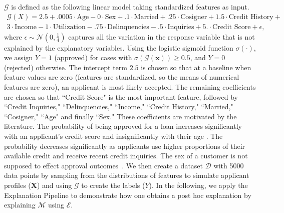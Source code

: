 \documentclass[12pt]{article}  %
\begin{document}
    $\mathcal{G}$ is defined as the following linear model taking standardized features as input. 
    \begin{equation}
    \label{eqn:gt}
    \begin{split}
    \mathcal{G}(X) =2.5 +.0005\cdot\text{Age} -0\cdot\text{Sex} +.1 \cdot \text{Married} + .25\cdot \text{Cosigner} + 1.5 \cdot \text{Credit History} + \\   3 \cdot \text{Income} - 1\cdot\text{Utilization} -.75 \cdot \text{Delinquencies} - .5\cdot\text{Inquiries} + 5.\cdot\text{Credit Score} + \epsilon,
    \end{split}
    \end{equation}
    \noindent where $\epsilon \sim \mathcal{N}(0,\frac{1}{4})$ captures all the variation in the response variable that is not explained by the explanatory variables.
    Using the logistic sigmoid function $\sigma(\cdot)$, we assign $Y = 1$ (approved) for cases with $\sigma(\mathcal{G}(\mathbf{x}))\geq 0.5$, and $Y = 0$ (rejected) otherwise. The intercept term $2.5$ is chosen so that at a baseline when feature values are zero (features are standardized, so the means of numerical features are zero), an applicant is most likely accepted. The remaining coefficients are chosen so that ``Credit Score" is the most important feature, followed by ``Credit Inquiries," ``Delinquencies," ``Income," ``Credit History," ``Married," ``Cosigner," ``Age" and finally ``Sex." These coefficients are motivated by the literature. The probability of being approved for a loan increases significantly with an applicant's credit score and insignificantly with their age \citep{cfb_age}. The probability decreases significantly as applicants use higher proportions of their available credit and receive recent credit inquiries. The sex of a customer is not supposed to effect approval outcomes~\citep{Calcagnini2014}. 
   We then create a dataset $\mathcal{D}$ with 5000 data points by sampling from the distributions of features to simulate applicant profiles ($\mathbf{X}$) and using $\mathcal{G}$ to create the labels ($Y$).  
   In the following, we apply the Explanation Pipeline to demonstrate how one obtains a post hoc explanation by explaining $\mathcal{M}$ using $\mathcal{E}$. 
\end{document}
